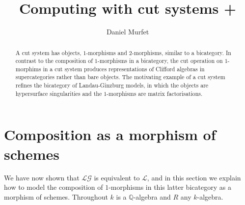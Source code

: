 \documentclass[english,letter paper,12pt,leqno]{article}
\theoremstyle{example}
\numberwithin{equation}{section}
\def\res{\operatorname{Res}}
\def\LG{\mathcal{LG}}
\def\nQ{\mathds{Q}}
\begin{document}
\def\Res{\res\!}
\newcommand{\ud}{\mathrm{d}}
\newcommand{\Ress}[1]{\res_{#1}\!}
\newcommand{\cat}[1]{\mathcal{#1}}
\newcommand{\lto}{\longrightarrow}
\newcommand{\xlto}[1]{\stackrel{#1}\lto}
\newcommand{\mf}[1]{\mathfrak{#1}}
\newcommand{\md}[1]{\mathscr{#1}}
\def\l{\,|\,}
\def\sgn{\textup{sgn}}

\title{Computing with cut systems +}
\author{Daniel Murfet}

\maketitle

\begin{abstract}
A cut system has objects, $1$-morphisms and $2$-morphisms, similar to a bicategory. In contrast to the composition of $1$-morphisms in a bicategory, the cut operation on $1$-morphims in a cut system produces representations of Clifford algebras in supercategories rather than bare objects. The motivating example of a cut system refines the bicategory of Landau-Ginzburg models, in which the objects are hypersurface singularities and the $1$-morphisms are matrix factorisations.
\end{abstract}

\tableofcontents

\section{Composition as a morphism of schemes}

We have now shown that $\LG$ is equivalent to $\cat{L}$, and in this section we explain how to model the composition of $1$-morphisms in this latter bicategory as a morphism of schemes. Throughout $k$ is a $\nQ$-algebra and $R$ any $k$-algebra.
\end{document}
